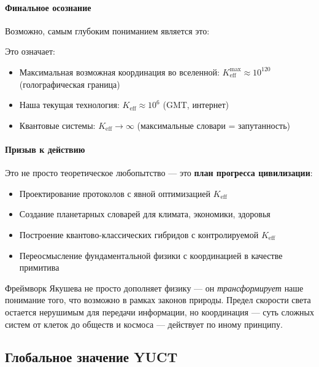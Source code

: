 \documentclass[11pt,a4paper]{article}
\begin{document}
	\paragraph{Финальное осознание}
	Возможно, самым глубоким пониманием является это:
	
	\begin{center}
	\end{center}
	
	Это означает:
	\begin{itemize}
		\item Максимальная возможная координация во вселенной: $K_{\mathrm{eff}}^{\max} \approx 10^{120}$ (голографическая граница)
		\item Наша текущая технология: $K_{\mathrm{eff}} \approx 10^6$ (GMT, интернет)
		\item Квантовые системы: $K_{\mathrm{eff}} \to \infty$ (максимальные словари = запутанность)
	\end{itemize}
	
	\paragraph{Призыв к действию}
	Это не просто теоретическое любопытство — это \textbf{план прогресса цивилизации}:
	
	\begin{itemize}
		\item Проектирование протоколов с явной оптимизацией $K_{\mathrm{eff}}$
		\item Создание планетарных словарей для климата, экономики, здоровья
		\item Построение квантово-классических гибридов с контролируемой $K_{\mathrm{eff}}$
		\item Переосмысление фундаментальной физики с координацией в качестве примитива
	\end{itemize}
	
	Фреймворк Якушева не просто дополняет физику — он \emph{трансформирует} наше понимание того, что возможно в рамках законов природы. Предел скорости света остается нерушимым для передачи информации, но координация — суть сложных систем от клеток до обществ и космоса — действует по иному принципу.
	
	\subsection{Глобальное значение YUCT}
	
\end{document}
